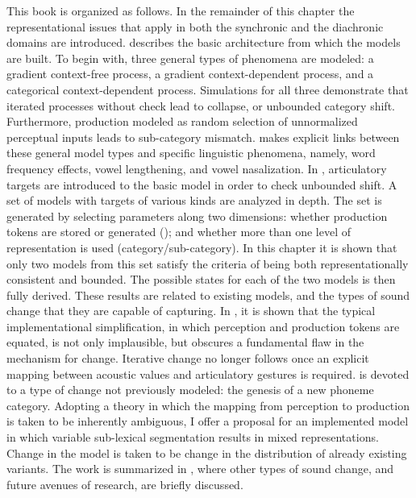 This book is organized as follows. In the remainder of this chapter
the representational issues that apply in both the synchronic and
the diachronic domains are introduced. 
describes the basic architecture from which the models are built.
To begin with, three general types of phenomena are modeled: a gradient
context-free process, a gradient context-dependent process, and a
categorical context-dependent process. Simulations for all three demonstrate
that iterated processes without check lead to collapse, or unbounded
category shift. Furthermore, production modeled as random selection
of unnormalized perceptual inputs leads to sub-category mismatch.
 makes explicit links
between these general model types and specific linguistic phenomena,
namely, word frequency effects, vowel lengthening, and vowel nasalization.
In , articulatory targets are introduced
to the basic model in order to check unbounded shift. A set of models
with targets of various kinds are analyzed in depth. The set is generated
by selecting parameters along two dimensions: whether production tokens
are stored or generated (); and whether more than
one level of representation is used (category/sub-category). In this
chapter it is shown that only two models from this set satisfy the
criteria of being both representationally consistent and bounded.
The possible states for each of the two models is then fully derived.
These results are related to existing models, and the types of sound
change that they are capable of capturing. In , 
it is shown that the typical implementational simplification, in which
perception and production tokens are equated, is not only implausible,
but obscures a fundamental flaw in the mechanism for change. Iterative
change no longer follows once an explicit mapping between acoustic
values and articulatory gestures is required. 
is devoted to a type of change not previously modeled: the genesis
of a new phoneme category. Adopting a theory in which the mapping
from perception to production is taken to be inherently ambiguous,
I offer a proposal for an implemented model in which variable sub-lexical
segmentation results in mixed representations. Change in the model
is taken to be change in the distribution of already existing variants.
The work is summarized in ,
where other types of sound change, and future avenues of research,
are briefly discussed. 

